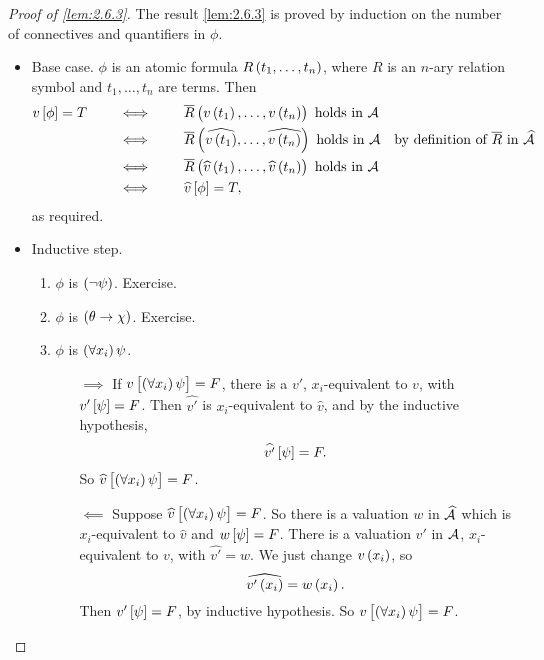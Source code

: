\begin{proof}[Proof of \ref{lem:2.6.3}]
The result \ref{lem:2.6.3} is proved by induction on the number of connectives and quantifiers in $ \phi $.
\begin{itemize}
\item Base case. $ \phi $ is an atomic formula $ R\br{t_1, \dots, t_n} $, where $ R $ is an $ n $-ary relation symbol and $ t_1, \dots, t_n $ are terms. Then
\begin{align*}
v\sbr{\phi} = T \qquad
& \iff \qquad \overline{R}\br{v\br{t_1}, \dots, v\br{t_n}} \ \text{holds in} \ \AA \\
& \iff \qquad \overline{R}\br{\widehat{v\br{t_1}}, \dots, \widehat{v\br{t_n}}} \ \text{holds in} \ \AA & \text{by definition of} \ \overline{R} \ \text{in} \ \widehat{\AA} \\
& \iff \qquad \overline{R}\br{\widehat{v}\br{t_1}, \dots, \widehat{v}\br{t_n}} \ \text{holds in} \ \AA \\
& \iff \qquad \widehat{v}\sbr{\phi} = T,
\end{align*}
as required.
\item Inductive step.
\begin{enumerate}[leftmargin=0.5in, label=Case \arabic*.]
\item $ \phi $ is $ \notb{\psi} $. Exercise.
\item $ \phi $ is $ \impb{\theta}{\chi} $. Exercise.
\item $ \phi $ is $ \fab{x_i}\psi $.
\begin{itemize}
\item[$ \implies $] If $ v\sbr{\fab{x_i}\psi} = F $, there is a $ v' $, $ x_i $-equivalent to $ v $, with $ v'\sbr{\psi} = F $. Then $ \widehat{v'} $ is $ x_i $-equivalent to $ \widehat{v} $, and by the inductive hypothesis,
$$ \widehat{v'}\sbr{\psi} = F. $$
So $ \widehat{v}\sbr{\fab{x_i}\psi} = F $.
\item[$ \impliedby $] Suppose $ \widehat{v}\sbr{\fab{x_i}\psi} = F $. So there is a valuation $ w $ in $ \widehat{\AA} $ which is $ x_i $-equivalent to $ \widehat{v} $ and $ w\sbr{\psi} = F $. There is a valuation $ v' $ in $ \AA $, $ x_i $-equivalent to $ v $, with $ \widehat{v'} = w $. We just change $ v\br{x_i} $, so
$$ \widehat{v'\br{x_i}} = w\br{x_i}. $$
Then $ v'\sbr{\psi} = F $, by inductive hypothesis. So $ v\sbr{\fab{x_i}\psi} = F $.
\end{itemize}
\end{enumerate}
\end{itemize}
\end{proof}

